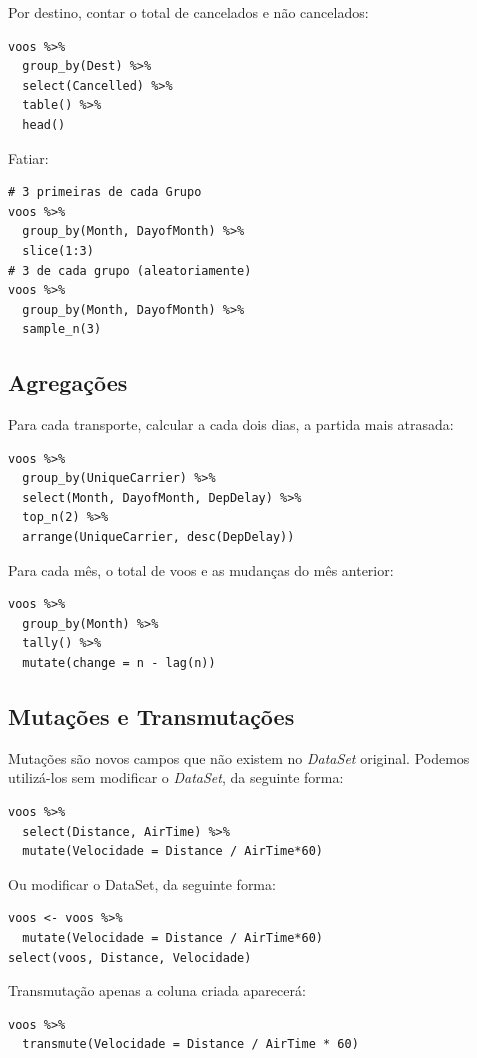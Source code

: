 \documentclass[a4paper,11pt]{article}
\begin{document}
Por destino, contar o total de cancelados e não cancelados:
\begin{lstlisting}
voos %>%
  group_by(Dest) %>%
  select(Cancelled) %>%
  table() %>%
  head()
\end{lstlisting}

Fatiar:
\begin{lstlisting}
# 3 primeiras de cada Grupo
voos %>% 
  group_by(Month, DayofMonth) %>% 
  slice(1:3)
# 3 de cada grupo (aleatoriamente)
voos %>% 
  group_by(Month, DayofMonth) %>% 
  sample_n(3)
\end{lstlisting}

\subsection{Agregações}
Para cada transporte, calcular a cada dois dias, a partida mais atrasada:
\begin{lstlisting}
voos %>%
  group_by(UniqueCarrier) %>%
  select(Month, DayofMonth, DepDelay) %>%
  top_n(2) %>%
  arrange(UniqueCarrier, desc(DepDelay))
\end{lstlisting}

Para cada mês, o total de voos e as mudanças do mês anterior:
\begin{lstlisting}
voos %>%
  group_by(Month) %>%
  tally() %>%
  mutate(change = n - lag(n))
\end{lstlisting}

\subsection{Mutações e Transmutações}
Mutações são novos campos que não existem no \textit{DataSet} original. Podemos utilizá-los sem modificar o \textit{DataSet}, da seguinte forma:
\begin{lstlisting}
voos %>%
  select(Distance, AirTime) %>%
  mutate(Velocidade = Distance / AirTime*60)
\end{lstlisting}

Ou modificar o DataSet, da seguinte forma:
\begin{lstlisting}
voos <- voos %>% 
  mutate(Velocidade = Distance / AirTime*60)
select(voos, Distance, Velocidade)
\end{lstlisting}

Transmutação apenas a coluna criada aparecerá:
\begin{lstlisting}
voos %>% 
  transmute(Velocidade = Distance / AirTime * 60)
\end{lstlisting}
\end{document}
